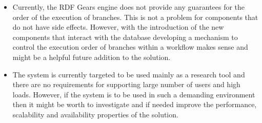\begin{itemize}
\item Currently, the RDF Gears engine does not provide any guarantees for the order of the execution of branches. This is not a problem for components that do not have side effects. However, with the introduction of the new components that interact with the database developing a mechanism to control the execution order of branches within a workflow makes sense and might be a helpful future addition to the solution.

\item The system is currently targeted to be used mainly as a research tool and there are no requirements for supporting large number of users and high loads. However, if the system is to be used in such a demanding environment then it might be worth to investigate and if needed improve the performance, scalability and availability properties of the solution.


\end{itemize}

